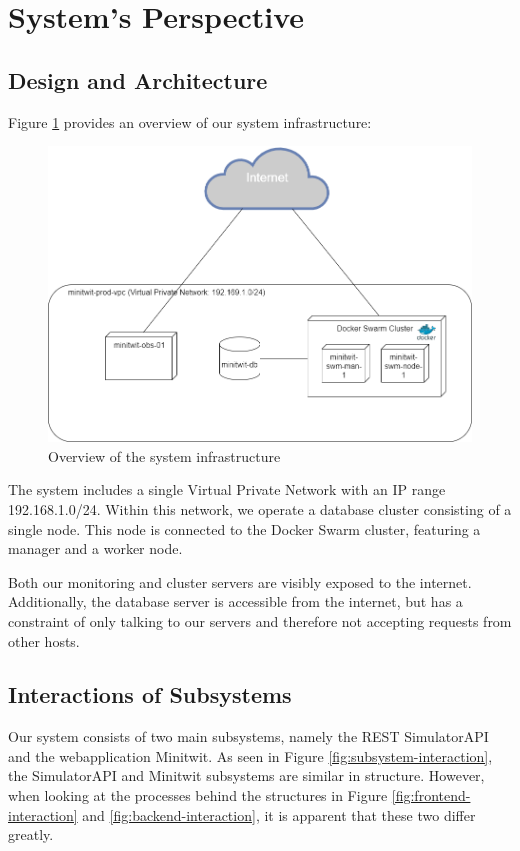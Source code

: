 \section{System's Perspective}

\subsection{Design and Architecture}
Figure \ref{fig:systemoverview} provides an overview of our system infrastructure:
\begin{figure}[H]
    \centering
    \includegraphics[width=0.7\linewidth]{images/system-overview3.png}
    \caption{Overview of the system infrastructure}
    \label{fig:systemoverview}

\end{figure}
The system includes a single Virtual Private Network with an IP range 192.168.1.0/24. Within this network, we operate a database cluster consisting of a single node. This node is connected to the Docker Swarm cluster, featuring a manager and a worker node.

Both our monitoring and cluster servers are visibly exposed to the internet. Additionally, the database server is accessible from the internet, but has a constraint of only talking to our servers and therefore not accepting requests from other hosts.

\subsection{Interactions of Subsystems}
Our system consists of two main subsystems, namely the REST SimulatorAPI and the webapplication Minitwit. As seen in Figure \ref{fig:subsystem-interaction}, the SimulatorAPI and Minitwit subsystems are similar in structure. However, when looking at the processes behind the structures in Figure \ref{fig:frontend-interaction} and \ref{fig:backend-interaction}, it is apparent that these two differ greatly.

